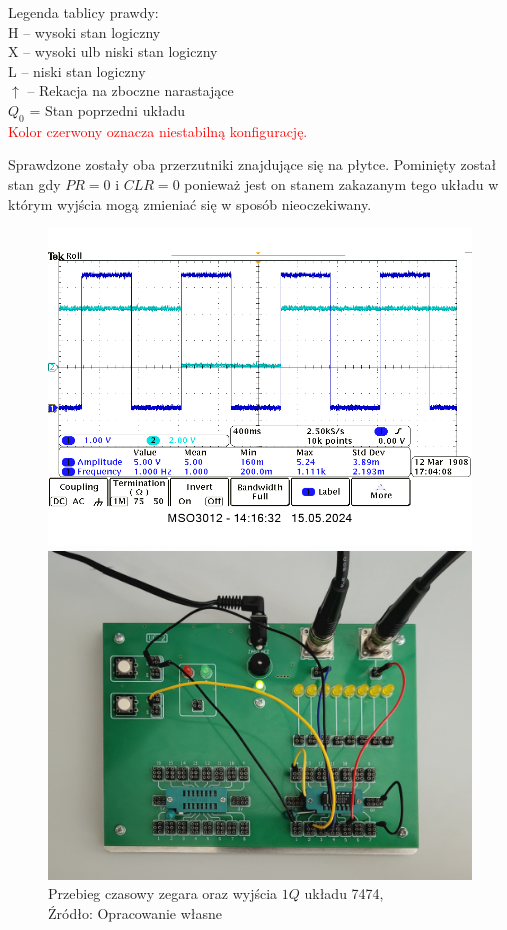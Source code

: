 \documentclass{article}
\begin{document}
      Legenda tablicy prawdy: \\
      H -- wysoki stan logiczny \\
      X -- wysoki ulb niski stan logiczny \\
      L -- niski stan logiczny \\
      $\uparrow$ -- Rekacja na zboczne narastające \\
      $Q_0$ = Stan poprzedni układu \\
      \textcolor{red}{Kolor czerwony oznacza niestabilną konfigurację.}

      Sprawdzone zostały oba przerzutniki znajdujące się na płytce. Pominięty został stan gdy $PR = 0$ i $CLR = 0$ ponieważ jest on stanem zakazanym tego układu w którym wyjścia mogą zmieniać się w sposób nieoczekiwany.

      \begin{figure}[!ht]
        \begin{minipage}{.5\textwidth}
          \centering
          \includegraphics[scale=0.35]{grafiki/5.2_CLK_Q_D.png}
          \caption{Przebieg czasowy zegara oraz wyjścia $1Q$ układu 7474,
          \\Źródło: Opracowanie własne}
        \end{minipage}
        \begin{minipage}{.5\textwidth}
          \centering
          \includegraphics[scale=0.1]{grafiki/Przerzutnik_D_zdj.png}

\end{minipage}
\end{figure}
\end{document}
